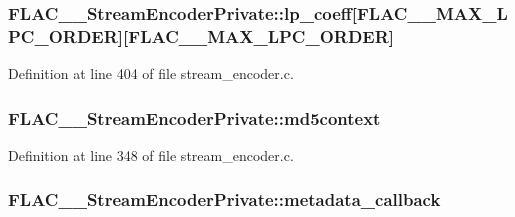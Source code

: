 \subsubsection[{\texorpdfstring{lp\+\_\+coeff}{lp_coeff}}]{ F\+L\+A\+C\+\_\+\+\_\+\+Stream\+Encoder\+Private\+::lp\+\_\+coeff\mbox{[}{\bf F\+L\+A\+C\+\_\+\+\_\+\+M\+A\+X\+\_\+\+L\+P\+C\+\_\+\+O\+R\+D\+ER}\mbox{]}\mbox{[}{\bf F\+L\+A\+C\+\_\+\+\_\+\+M\+A\+X\+\_\+\+L\+P\+C\+\_\+\+O\+R\+D\+ER}\mbox{]}}\hypertarget{struct_f_l_a_c_____stream_encoder_private_a0f2e15cf726e73e23fb3bc5d5fb4e47a}{}\label{struct_f_l_a_c_____stream_encoder_private_a0f2e15cf726e73e23fb3bc5d5fb4e47a}


Definition at line 404 of file stream\+\_\+encoder.\+c.

\subsubsection[{\texorpdfstring{md5context}{md5context}}]{ F\+L\+A\+C\+\_\+\+\_\+\+Stream\+Encoder\+Private\+::md5context}\hypertarget{struct_f_l_a_c_____stream_encoder_private_a51b589c4479a224c6295a469b84e0e16}{}\label{struct_f_l_a_c_____stream_encoder_private_a51b589c4479a224c6295a469b84e0e16}


Definition at line 348 of file stream\+\_\+encoder.\+c.

\subsubsection[{\texorpdfstring{metadata\+\_\+callback}{metadata_callback}}]{ F\+L\+A\+C\+\_\+\+\_\+\+Stream\+Encoder\+Private\+::metadata\+\_\+callback}\hypertarget{struct_f_l_a_c_____stream_encoder_private_ab3331280f777a0f9e4187b4342df37d1}{}\label{struct_f_l_a_c_____stream_encoder_private_ab3331280f777a0f9e4187b4342df37d1}


